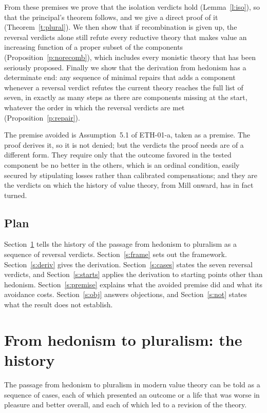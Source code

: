 \documentclass{situationist-preprint}
\begin{document}
From these premises we prove that the isolation verdicts hold (Lemma~\ref{l:iso}), so that the principal's theorem follows, and we give a direct proof of it (Theorem~\ref{t:plural}). We then show that if recombination is given up, the reversal verdicts alone still refute every reductive theory that makes value an increasing function of a proper subset of the components (Proposition~\ref{p:norecomb}), which includes every monistic theory that has been seriously proposed. Finally we show that the derivation from hedonism has a determinate end: any sequence of minimal repairs that adds a component whenever a reversal verdict refutes the current theory reaches the full list of seven, in exactly as many steps as there are components missing at the start, whatever the order in which the reversal verdicts are met (Proposition~\ref{p:repair}).

The premise avoided is Assumption~5.1 of ETH-01-a, taken as a premise. The proof derives it, so it is not denied; but the verdicts the proof needs are of a different form. They require only that the outcome favored in the tested component be no better in the others, which is an ordinal condition, easily secured by stipulating losses rather than calibrated compensations; and they are the verdicts on which the history of value theory, from Mill onward, has in fact turned.

\subsection{Plan}

Section~\ref{s:history} tells the history of the passage from hedonism to pluralism as a sequence of reversal verdicts. Section~\ref{s:frame} sets out the framework. Section~\ref{s:deriv} gives the derivation. Section~\ref{s:cases} states the seven reversal verdicts, and Section~\ref{s:starts} applies the derivation to starting points other than hedonism. Section~\ref{s:premise} explains what the avoided premise did and what its avoidance costs. Section~\ref{s:obj} answers objections, and Section~\ref{s:not} states what the result does not establish.

\section{From hedonism to pluralism: the history}\label{s:history}

The passage from hedonism to pluralism in modern value theory can be told as a sequence of cases, each of which presented an outcome or a life that was worse in pleasure and better overall, and each of which led to a revision of the theory.
\end{document}
